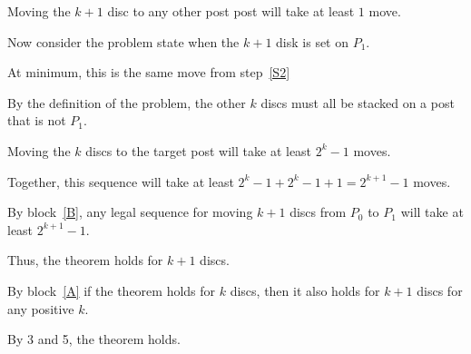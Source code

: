 \documentclass[11pt]{article}
\begin{document}
\begin{problems}
\begin{longFormProof}
\begin{block}[A]
\begin{block}[B]
        \step[S2] Moving the $k+1$ disc to any other post post will take at least $1$ move.

        \step Now consider the problem state when the $k+1$ disk is set on $P_1$.

        \step At minimum, this is the same move from step~\ref{S2}

        \step By the definition of the problem, the other $k$ discs must all be stacked on a post that is not $P_1$.

        \step Moving the $k$ discs to the target post will take at least $2^k-1$ moves.

        \step Together, this sequence will take at least $2^k-1 + 2^k-1 + 1 = 2^{k+1} - 1$ moves.

      \end{block}

      \step By block~\ref{B}, any legal sequence for moving $k+1$ discs from $P_0$ to $P_1$ will take at least $2^{k+1} - 1$.

      \step Thus, the theorem holds for $k+1$ discs.

    \end{block}

    \step By block~\ref{A} if the theorem holds for $k$ discs, then it also holds for $k+1$ discs for any positive $k$.

    \step By 3 and 5, the theorem holds.
    
  \end{longFormProof}


\end{problems}
\end{document}
